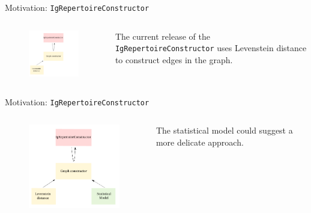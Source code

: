 \documentclass{beamer}\usepackage[]{graphicx}\usepackage[]{color}
\begin{document}
\begin{frame}{Motivation: \texttt{IgRepertoireConstructor}}
  \begin{columns}[c]
    \begin{column}{0.5\textwidth}
      \begin{figure}[h]
        \includegraphics[width=200pt]{Pictures/igRepConstr1.pdf}
      \end{figure}
    \end{column}
    \begin{column}{0.4\textwidth}
      \begin{center}
        The current release of the \texttt{IgRepertoireConstructor} uses Levenstein distance to construct edges in the graph.
      \end{center}
    \end{column}
  \end{columns}
\end{frame}

\begin{frame}{Motivation: \texttt{IgRepertoireConstructor}}
  \begin{columns}[c]
    \begin{column}{0.5\textwidth}
      \begin{figure}[h]
        \includegraphics[width=200pt]{Pictures/igRepConstr2.pdf}
      \end{figure}
    \end{column}
    \begin{column}{0.4\textwidth}
      \begin{center}
        The statistical model could suggest a more delicate approach.
      \end{center}
    \end{column}
  \end{columns}
\end{frame}
\end{document}
